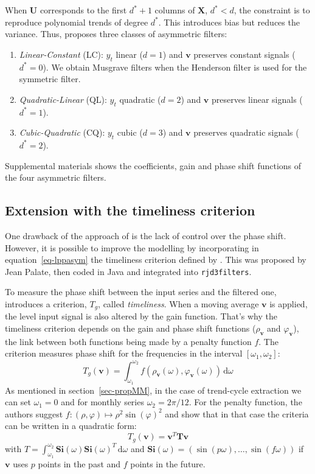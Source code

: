 \documentclass[
]{article}
\newcommand\transp[1]{{#1}^T}
\newcommand\1{\mathds{1}}
\newcommand\ud{\,\mathrm{d}}
\begin{document}
When \(\boldsymbol U\) corresponds to the first \(d^*+1\) columns of
\(\boldsymbol X\), \(d^*<d\), the constraint is to reproduce polynomial
trends of degree \(d^*\). This introduces bias but reduces the variance.
Thus, \textcite{proietti2008} proposes three classes of asymmetric
filters:

\begin{enumerate}
\def\labelenumi{\arabic{enumi}.}
\item
  \emph{Linear-Constant} (LC): \(y_t\) linear (\(d=1\)) and
  \(\boldsymbol v\) preserves constant signals (\(d^*=0\)). We obtain
  Musgrave filters when the Henderson filter is used for the symmetric
  filter.
\item
  \emph{Quadratic-Linear} (QL): \(y_t\) quadratic (\(d=2\)) and
  \(\boldsymbol v\) preserves linear signals (\(d^*=1\)).
\item
  \emph{Cubic-Quadratic} (CQ): \(y_t\) cubic (\(d=3\)) and
  \(\boldsymbol v\) preserves quadratic signals (\(d^*=2\)).
\end{enumerate}

Supplemental materials shows the coefficients, gain and phase shift
functions of the four asymmetric filters.

\subsection{Extension with the timeliness
criterion}\label{sec-lptimeliness}

One drawback of the approach of \textcite{proietti2008} is the lack of
control over the phase shift. However, it is possible to improve the
modelling by incorporating in equation~\ref{eq-lppasym} the timeliness
criterion defined by \textcite{ch15HBSA}. This was proposed by Jean
Palate, then coded in Java and integrated into \texttt{rjd3filters}.

To measure the phase shift between the input series and the filtered
one, \textcite{ch15HBSA} introduces a criterion, \(T_g\), called
\emph{timeliness}. When a moving average \(\boldsymbol v\) is applied,
the level input signal is also altered by the gain function. That's why
the timeliness criterion depends on the gain and phase shift functions
(\(\rho_{\boldsymbol v}\) and \(\varphi_{\boldsymbol v}\)), the link
between both functions being made by a penalty function \(f\). The
criterion measures phase shift for the frequencies in the interval
\([\omega_1, \omega_2]\): \[
T_g(\boldsymbol v)=\int_{\omega_{1}}^{\omega_{2}}f(\rho_{\boldsymbol v}(\omega),\varphi_{\boldsymbol v}(\omega))\ud\omega
\] As mentioned in section~\ref{sec-propMM}, in the case of trend-cycle
extraction we can set \(\omega_1=0\) and for monthly series
\(\omega_2=2\pi/12.\) For the penalty function, the authors suggest
\(f\colon(\rho,\varphi)\mapsto\rho^2\sin(\varphi)^2\) and show that in
that case the criteria can be written in a quadratic form: \[
T_g(\boldsymbol v) = \transp{\boldsymbol v}\boldsymbol T\boldsymbol v
\] with
\(T\boldsymbol=\int_{\omega_{1}}^{\omega_{2}}\boldsymbol{Si}(\omega)\transp{\boldsymbol{Si}(\omega)}\ud\omega\)
and \(\boldsymbol{Si}(\omega)=(\sin(p\omega),\dots, \sin (f\omega))\) if
\(\boldsymbol v\) uses \(p\) points in the past and \(f\) points in the
future.
\end{document}
